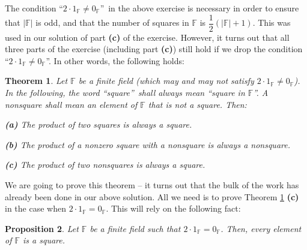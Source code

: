 \documentclass[paper=a4, fontsize=12pt]{scrartcl}%
\theoremstyle{plainsl}
\newtheorem{theorem}{Theorem}[section]
\newtheorem{proposition}[theorem]{Proposition}
\theoremstyle{definition}
\theoremstyle{remark}
\begin{document}
The condition \textquotedblleft$2\cdot1_{\mathbb{F}}\neq0_{\mathbb{F}}%
$\textquotedblright\ in the above exercise is necessary in order to ensure
that $\left\vert \mathbb{F}\right\vert $ is odd, and that the number of
squares in $\mathbb{F}$ is $\dfrac{1}{2}\left(  \left\vert \mathbb{F}%
\right\vert +1\right)  $. This was used in our solution of part \textbf{(c)}
of the exercise. However, it turns out that all three parts of the exercise
(including part \textbf{(c)}) still hold if we drop the condition
\textquotedblleft$2\cdot1_{\mathbb{F}}\neq0_{\mathbb{F}}$\textquotedblright.
In other words, the following holds:

\begin{theorem}
\label{thm.sol.finfield.squares2.gen}Let $\mathbb{F}$ be a finite field (which
may and may not satisfy $2\cdot1_{\mathbb{F}}\neq0_{\mathbb{F}}$). In the
following, the word \textquotedblleft square\textquotedblright\ shall always
mean \textquotedblleft square in $\mathbb{F}$\textquotedblright. A
\textit{nonsquare} shall mean an element of $\mathbb{F}$ that is not a square. Then:

\textbf{(a)} The product of two squares is always a square.

\textbf{(b)} The product of a nonzero square with a nonsquare is always a nonsquare.

\textbf{(c)} The product of two nonsquares is always a square.
\end{theorem}

We are going to prove this theorem -- it turns out that the bulk of the work
has already been done in our above solution. All we need is to prove Theorem
\ref{thm.sol.finfield.squares2.gen} \textbf{(c)} in the case when
$2\cdot1_{\mathbb{F}}=0_{\mathbb{F}}$. This will rely on the following fact:

\begin{proposition}
\label{prop.sol.finfields.squares2.2}Let $\mathbb{F}$ be a finite field such
that $2\cdot1_{\mathbb{F}}=0_{\mathbb{F}}$. Then, every element of
$\mathbb{F}$ is a square.
\end{proposition}
\end{document}
